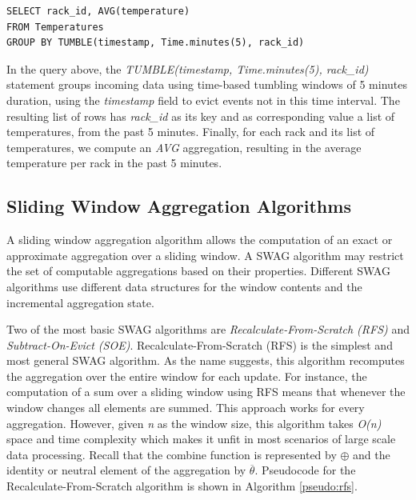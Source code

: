 \begin{verbatim}
SELECT rack_id, AVG(temperature)
FROM Temperatures
GROUP BY TUMBLE(timestamp, Time.minutes(5), rack_id)
\end{verbatim}

In the query above, the \textit{TUMBLE(timestamp, Time.minutes(5), rack\_id)} statement groups incoming data using time-based tumbling windows of 5 minutes duration, using the \textit{timestamp} field to evict events not in this time interval. The resulting list of rows has \textit{rack\_id} as its key and as corresponding value a list of temperatures, from the past 5 minutes. Finally, for each rack and its list of temperatures, we compute an \textit{AVG} aggregation, resulting in the average temperature per rack in the past 5 minutes.


\subsection{Sliding Window Aggregation Algorithms} \label{sec:back-swag-algs}

A sliding window aggregation algorithm allows the computation of an exact or approximate aggregation over a sliding window. A SWAG algorithm may restrict the set of computable aggregations based on their properties. Different SWAG algorithms use different data structures for the window contents and the incremental aggregation state.

Two of the most basic SWAG algorithms are \textit{Recalculate-From-Scratch (RFS)} and \textit{Subtract-On-Evict (SOE)}. Recalculate-From-Scratch (RFS) is the simplest and most general SWAG algorithm. As the name suggests, this algorithm recomputes the aggregation over the entire window for each update. For instance, the computation of a sum over a sliding window using RFS means that whenever the window changes all elements are summed. This approach works for every aggregation. However, given \textit{n} as the window size, this algorithm takes \textit{O(n)} space and time complexity which makes it unfit in most scenarios of large scale data processing. Recall that the combine function is represented by $\oplus$ and the identity or neutral element of the aggregation by $\overline{\theta}$. Pseudocode for the Recalculate-From-Scratch algorithm is shown in Algorithm \ref{pseudo:rfs}.
  

